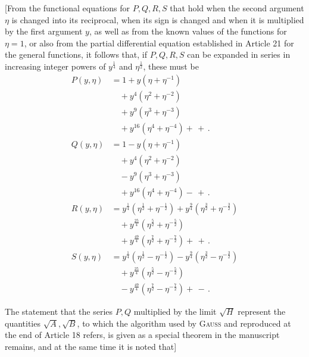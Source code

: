 \begingroup
\renewcommand{\arraystretch}{1.45}
[From the functional equations for $P,\allowbreak Q,\allowbreak R,\allowbreak S$ that hold when the second argument $\eta$ is changed into its reciprocal, when its sign is changed and when it is multiplied by the first argument $y$, as well as from the known values of the functions for $\eta=1$, or also from the partial differential equation established in Article 21 for the general functions, it follows that, if $P,\allowbreak Q,\allowbreak R,\allowbreak S$ can be expanded in series in increasing integer powers of $y^{\frac14}$ and $\eta^{\frac12}$, these must be
\[
\begin{aligned}
P(y,\eta)&=1+y(\eta+\eta^{-1})\\[4pt]&\quad{}+y^4(\eta^2+\eta^{-2})\\[4pt]&\quad{}+y^9(\eta^3+\eta^{-3})\\[4pt]&\quad{}+y^{16}(\eta^4+\eta^{-4})+\,+\,.\\[10pt]
Q(y,\eta)&=1-y(\eta+\eta^{-1})\\[4pt]&\quad{}+y^4(\eta^2+\eta^{-2})\\[4pt]&\quad{}-y^9(\eta^3+\eta^{-3})\\[4pt]&\quad{}+y^{16}(\eta^4+\eta^{-4})-\,+\,.\\[10pt]
R(y,\eta)&=y^{\frac14}(\eta^{\frac12}+\eta^{-\frac12})+y^{\frac94}(\eta^{\frac32}+\eta^{-\frac32})\\[4pt]&\quad{}+y^{\frac{25}4}(\eta^{\frac52}+\eta^{-\frac52})\\[4pt]&\quad{}+y^{\frac{49}4}(\eta^{\frac72}+\eta^{-\frac72})+\,+\,.\\[10pt]
S(y,\eta)&=y^{\frac14}(\eta^{\frac12}-\eta^{-\frac12})-y^{\frac94}(\eta^{\frac32}-\eta^{-\frac32})\\[4pt]&\quad{}+y^{\frac{25}4}(\eta^{\frac52}-\eta^{-\frac52})\\[4pt]&\quad{}-y^{\frac{49}4}(\eta^{\frac72}-\eta^{-\frac72})+\,-\,.
\end{aligned}
\]

The statement that the series $P,\allowbreak Q$ multiplied by the limit $\surd  H$ represent the quantities $\surd  A,\allowbreak \surd  B$, to which the algorithm used by \textsc{Gauss} and reproduced at the end of Article 18 refers, is given as a special theorem in the manuscript remains, and at the same time it is noted that]

